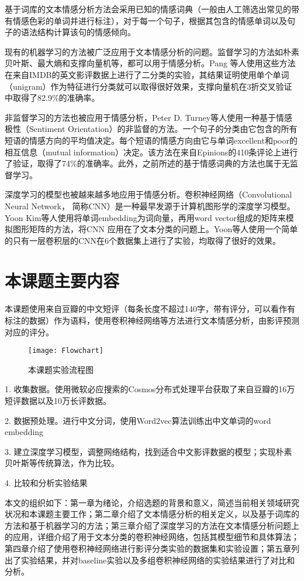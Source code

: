 基于词库的文本情感分析方法会采用已知的情感词典（一般由人工筛选出常见的带有情感色彩的单词并进行标注），对于每一个句子，根据其包含的情感单词以及句子的语法结构计算该句的情感倾向\cite{taboada.2011.lexicon}。

现有的机器学习的方法被广泛应用于文本情感分析的问题。监督学习的方法如朴素贝叶斯、最大熵和支撑向量机等，都可以用于情感分析。Pang 等人使用这些方法在来自IMDB的英文影评数据上进行了二分类的实验，其结果证明使用单个单词（unigram）作为特征进行分类就可以取得很好效果，支撑向量机在3折交叉验证中取得了82.9\%的准确率\cite{Pang.2002.ml}。

非监督学习的方法也被应用于情感分析，Peter D. Turney等人使用一种基于情感极性（Sentiment Orientation）的非监督的方法。一个句子的分类由它包含的所有短语的情感方向的平均值决定\cite{turney.2002.thumbs}。每个短语的情感方向由它与单词excellent和poor的相互信息（mutual information）决定。该方法在来自Epinions的410条评论上进行了验证，取得了74\%的准确率。此外，之前所述的基于情感词典的方法也属于无监督学习。

深度学习的模型也被越来越多地应用于情感分析。卷积神经网络（Convolutional Neural Network， 简称CNN）是一种最早发源于计算机图形学的深度学习模型。Yoon Kim等人使用将单词embedding为词向量，再用word vector组成的矩阵来模拟图形矩阵的方法，将CNN 应用在了文本分类的问题上\cite{kim.2014.convolutional}。Yoon等人使用一个简单的只有一层卷积层的CNN在6个数据集上进行了实验，均取得了很好的效果。

\section{本课题主要内容}
本课题使用来自豆瓣的中文短评（每条长度不超过140字，带有评分，可以看作有标注的数据）作为语料，使用卷积神经网络等方法进行文本情感分析，由影评预测对应的评分。

\begin{figure}[ht]
\centering
\texttt{[image: Flowchart]}
\caption{本课题实验流程图} \label{fig:Flowchart}
\end{figure}


1.	收集数据。使用微软必应搜索的Cosmos分布式处理平台获取了来自豆瓣的16万短评数据以及10万长评数据。

2.	数据预处理。进行中文分词，使用Word2vec算法训练出中文单词的word embedding

3.	建立深度学习模型，调整网络结构，找到适合中文影评数据的模型；实现朴素贝叶斯等传统算法，作为比较。

4.	比较和分析实验结果

本文的组织如下：第一章为绪论，介绍选题的背景和意义，简述当前相关领域研究状况和本课题主要工作；第二章介绍了文本情感分析的相关定义，以及基于词库的方法和基于机器学习的方法；第三章介绍了深度学习的方法在文本情感分析问题上的应用，详细介绍了用于文本分类的卷积神经网络，包括其模型细节和具体算法；第四章介绍了使用卷积神经网络进行影评分类实验的数据集和实验设置；第五章列出了实验结果，并对baseline实验以及多组卷积神经网络的实验结果进行了对比和分析。
